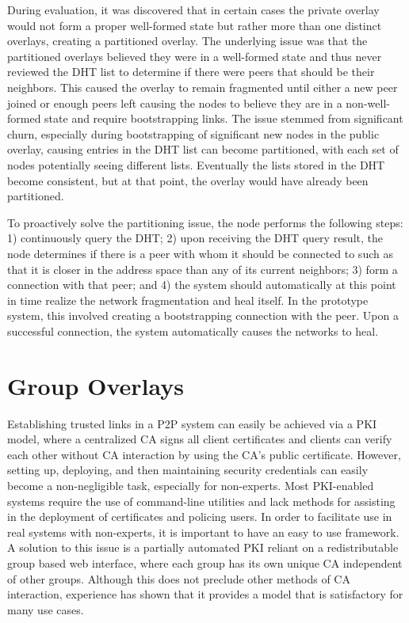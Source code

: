 During evaluation, it was discovered that in certain cases the private overlay
would not form a proper well-formed state but rather more than one distinct
overlays, creating a partitioned overlay.  The underlying issue was that the
partitioned overlays believed they were in a well-formed state and thus never
reviewed the DHT list to determine if there were peers that should be their
neighbors.  This caused the overlay to remain fragmented until either a new
peer joined or enough peers left causing the nodes to believe they are in a
non-well-formed state and require bootstrapping links.  The issue stemmed from
significant churn, especially during bootstrapping of significant new nodes in
the public overlay, causing entries in the DHT list can become partitioned,
with each set of nodes potentially seeing different lists.  Eventually the
lists stored in the DHT become consistent, but at that point, the overlay would
have already been partitioned.

To proactively solve the partitioning issue, the node performs the following
steps: 1) continuously query the DHT;  2) upon receiving the DHT query result,
the node determines if there is a peer with whom it should be connected to
such as that it is closer in the address space than any of its current neighbors;
3) form a connection with that peer; and 4) the system should automatically at
this point in time realize the network fragmentation and heal itself.  In the
prototype system, this involved creating a bootstrapping connection with the
peer.  Upon a successful connection, the system automatically causes the
networks to heal.

\section{Group Overlays}
\label{group_overlays}
Establishing trusted links in a P2P system can easily be achieved via a PKI
model, where a centralized CA signs all client certificates and clients can
verify each other without CA interaction by using the CA's public certificate.
However, setting up, deploying, and then maintaining security credentials can
easily become a non-negligible task, especially for non-experts.  Most
PKI-enabled systems require the use of command-line utilities and lack methods
for assisting in the deployment of certificates and policing users.  In order
to facilitate use in real systems with non-experts, it is important to have an
easy to use framework.  A solution to this issue is a partially automated PKI
reliant on a redistributable group based web interface, where each group has
its own unique CA independent of other groups.  Although this does not preclude
other methods of CA interaction, experience has shown that it provides a model
that is satisfactory for many use cases.  

